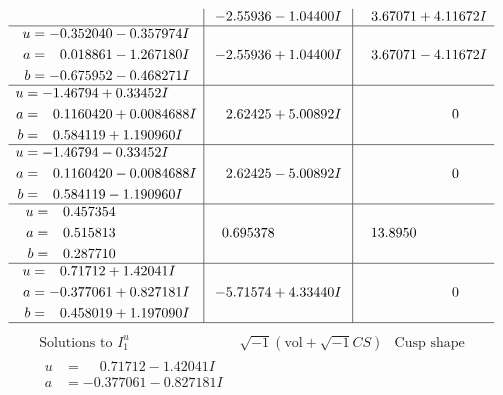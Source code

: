 \documentclass[1p]{elsarticle_modified}
\theoremstyle{definition}
\newcommand{\I}{\sqrt{-1}}
\begin{document}
$$\begin{array}{c|c|c}
 & -2.55936 - 1.04400 I & \phantom{-}3.67071 + 4.11672 I \\ \hline\begin{aligned}
u &= -0.352040 - 0.357974 I \\
a &= \phantom{-}0.018861 - 1.267180 I \\
b &= -0.675952 - 0.468271 I\end{aligned}
 & -2.55936 + 1.04400 I & \phantom{-}3.67071 - 4.11672 I \\ \hline\begin{aligned}
u &= -1.46794 + 0.33452 I \\
a &= \phantom{-}0.1160420 + 0.0084688 I \\
b &= \phantom{-}0.584119 + 1.190960 I\end{aligned}
 & \phantom{-}2.62425 + 5.00892 I & \phantom{-0.000000 } 0 \\ \hline\begin{aligned}
u &= -1.46794 - 0.33452 I \\
a &= \phantom{-}0.1160420 - 0.0084688 I \\
b &= \phantom{-}0.584119 - 1.190960 I\end{aligned}
 & \phantom{-}2.62425 - 5.00892 I & \phantom{-0.000000 } 0 \\ \hline\begin{aligned}
u &= \phantom{-}0.457354\phantom{ +0.000000I} \\
a &= \phantom{-}0.515813\phantom{ +0.000000I} \\
b &= \phantom{-}0.287710\phantom{ +0.000000I}\end{aligned}
 & \phantom{-}0.695378\phantom{ +0.000000I} & \phantom{-}13.8950\phantom{ +0.000000I} \\ \hline\begin{aligned}
u &= \phantom{-}0.71712 + 1.42041 I \\
a &= -0.377061 + 0.827181 I \\
b &= \phantom{-}0.458019 + 1.197090 I\end{aligned}
 & -5.71574 + 4.33440 I & \phantom{-0.000000 } 0\\
 \hline 
 \end{array}$$\newpage$$\begin{array}{c|c|c}  
\text{Solutions to }I^u_{1}& \I (\text{vol} + \sqrt{-1}CS) & \text{Cusp shape}\\
 \hline 
\begin{aligned}
u &= \phantom{-}0.71712 - 1.42041 I \\
a &= -0.377061 - 0.827181 I \\

\end{aligned}
\end{array}$$
\end{document}
